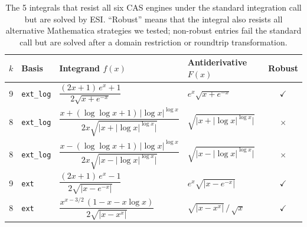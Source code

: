 \begin{table}
  \centering
  \caption{The 5 integrals that resist all six CAS engines under the standard integration call but are solved by ESI. ``Robust'' means that the integral also resists all alternative Mathematica strategies we tested; non-robust entries fail the standard call but are solved after a domain restriction or roundtrip transformation.}
  \label{tab:cas_blind}
  \small
  \begin{tabular}{clllc}
    \toprule
    $k$ & Basis & Integrand $f(x)$ & Antiderivative $F(x)$ & Robust \\
    \midrule
    9 & \texttt{ext\_log} &
      $\dfrac{(2x+1)\,e^x + 1}{2\sqrt{x + e^{-x}}}$ &
      $e^x\sqrt{x + e^{-x}}$ &
      $\checkmark$ \\[8pt]
    8 & \texttt{ext\_log} &
      $\dfrac{x + (\log\log x + 1)\,\lvert\!\log x\rvert^{\log x}}{2x\sqrt{\bigl\lvert x + \lvert\!\log x\rvert^{\log x}\bigr\rvert}}$ &
      $\sqrt{\bigl\lvert x + \lvert\!\log x\rvert^{\log x}\bigr\rvert}$ &
      $\times$ \\[8pt]
    8 & \texttt{ext\_log} &
      $\dfrac{x - (\log\log x + 1)\,\lvert\!\log x\rvert^{\log x}}{2x\sqrt{\bigl\lvert x - \lvert\!\log x\rvert^{\log x}\bigr\rvert}}$ &
      $\sqrt{\bigl\lvert x - \lvert\!\log x\rvert^{\log x}\bigr\rvert}$ &
      $\times$ \\[8pt]
    \midrule
    9 & \texttt{ext} &
      $\dfrac{(2x+1)\,e^x - 1}{2\sqrt{\lvert x - e^{-x}\rvert}}$ &
      $e^x\sqrt{\lvert x - e^{-x}\rvert}$ &
      $\checkmark$ \\[8pt]
    8 & \texttt{ext} &
      $\dfrac{x^{x - 3/2}\,(1 - x - x\log x)}{2\sqrt{\lvert x - x^x\rvert}}$ &
      $\sqrt{\lvert x - x^x\rvert}\,/\,\sqrt{x}$ &
      $\checkmark$ \\[8pt]
    \bottomrule
  \end{tabular}
\end{table}
